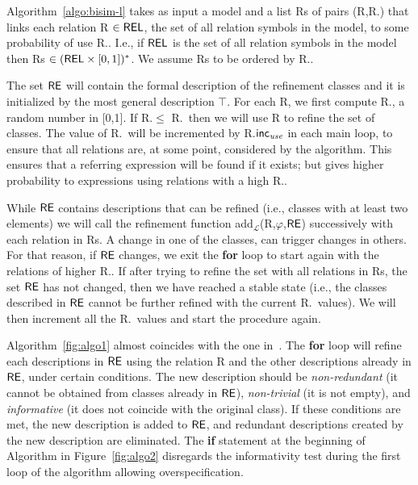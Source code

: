 
Algorithm~\ref{algo:bisim-l} takes as input a model and a list Rs of pairs (R,R.\puse) that links each relation R $\in \textsf{REL}$, the set of all relation symbols in the model,  to some probability of use R.\puse. 
I.e., if $\textsf{REL}$ is the set of all relation symbols in the model then Rs $\in (\textsf{REL} \times [0,1])^*$. We assume Rs to be ordered by R.\puse. 

The set $\textsf{RE}$ will contain the formal description of the refinement classes and it is initialized by the most general description $\top$.  
For each R, we first compute R.\randomuse, a random number in [0,1].  If R.\randomuse $\le$ R.\puse\ then we will use R to refine the set of classes.  The value of R.\puse\ will be incremented by R.$\textsf{inc}_\emph{use}$ in each main loop, to ensure that all relations are, at some point, considered by the algorithm.  This ensures that a referring expression will be found if it exists; but gives higher probability to expressions using relations with a high R.\puse. 

While $\textsf{RE}$ contains descriptions that can be refined (i.e., classes with at least two elements) we will call the refinement function add$_\mathcal{L}$(R,$\varphi$,$\textsf{RE}$) successively with each relation in Rs. A change in one of the classes, can trigger changes in others. For that reason, if $\textsf{RE}$ changes, we exit the \textbf{for} loop to start again with the relations of higher R.\puse. If after trying to refine the set with all relations in Rs, the set $\textsf{RE}$ has not changed, then we have reached a stable state (i.e., the classes described in $\textsf{RE}$ cannot be further refined with the current R.\puse\ values). We will then increment all the R.\puse\ values and start the procedure again. 

Algorithm~\ref{fig:algo1} almost coincides with the one in~\cite{arec2:2008:Areces}.  The \textbf{for} loop will refine each descriptions in $\textsf{RE}$ using the relation R and the other descriptions already in $\textsf{RE}$, under certain conditions. The new description should be \emph{non-redundant} (it cannot be obtained from classes already in $\textsf{RE}$), \emph{non-trivial} (it is not empty), and \emph{informative} (it does not coincide with the original class).  If these conditions are met, the new description is added to $\textsf{RE}$, and redundant descriptions created by the new description are eliminated. The \textbf{if} statement at the beginning of Algorithm in Figure~\ref{fig:algo2} disregards the informativity test during the first loop of the algorithm allowing overspecification.    

